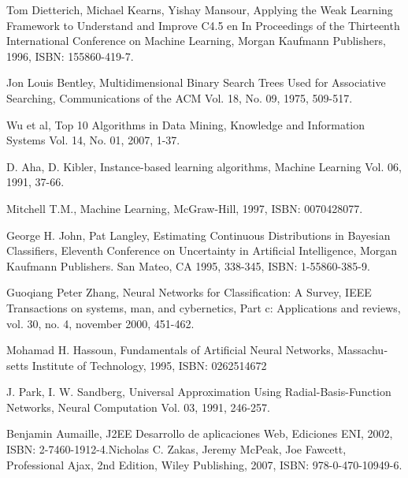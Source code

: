 \begin{thebibliography}{Referencias}
\foreignlanguage{spanish}{Tom Dietterich, Michael Kearns, Yishay Mansour, Applying the Weak Learning Framework to Understand and Improve C4.5 en In Proceedings of the Thirteenth International Conference on Machine Learning, Morgan Kaufmann Publishers, 1996, ISBN: 155860-419-7.}

Jon Louis Bentley, Multidimensional Binary Search Trees Used for Associative Searching, Communications of the ACM Vol. 18, No. 09, 1975, 509-517.

Wu et al, Top 10 Algorithms in Data Mining, Knowledge and Information Systems Vol. 14, No. 01, 2007, 1-37.

D. Aha, D. Kibler, Instance-based learning algorithms, Machine Learning Vol.
06, 1991, 37-66.

\foreignlanguage{spanish}{Mitchell T.M., Machine Learning, McGraw-Hill, 1997, ISBN: 0070428077.}

George H. John, Pat Langley, Estimating Continuous Distributions in Bayesian Classifiers, Eleventh Conference on Uncertainty in Artificial Intelligence, Morgan Kaufmann Publishers. San Mateo, CA 1995, 338-345, ISBN: 1-55860-385-9.

Guoqiang Peter Zhang, Neural Networks for Classification: A Survey, IEEE Transactions on systems, man, and cybernetics, Part c: Applications and reviews, vol. 30, no. 4, november 2000, 451-462.

\foreignlanguage{spanish}{Mohamad H. Hassoun, Fundamentals of Artificial Neural Networks, Massachusetts Institute of Technology, 1995, ISBN: 0262514672}

J. Park, I. W. Sandberg, Universal Approximation Using Radial-Basis-Function
Networks, Neural Computation Vol.
03, 1991, 246-257.

Benjamin Aumaille, J2EE Desarrollo de aplicaciones Web, Ediciones ENI, 2002, ISBN: 2-7460-1912-4.Nicholas C. Zakas, Jeremy McPeak, Joe Fawcett, Professional Ajax, 2nd Edition, Wiley Publishing, 2007, ISBN: 978-0-470-10949-6.\end{thebibliography}